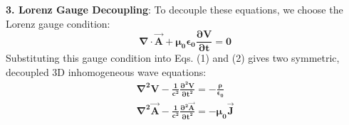 \begin{theorysol}
\textbf{3. Lorenz Gauge Decoupling}:
To decouple these equations, we choose the Lorenz gauge condition:
\begin{equation}
\mathbf{\nabla \cdot \vec{A} + \mu_0\epsilon_0 \frac{\partial V}{\partial t} = 0}
\end{equation}
Substituting this gauge condition into Eqs. (1) and (2) gives two symmetric, decoupled 3D inhomogeneous wave equations:
\begin{align}
\mathbf{\nabla^2 V - \frac{1}{c^2}\frac{\partial^2 V}{\partial t^2} = -\frac{\rho}{\epsilon_0}} \\
\mathbf{\nabla^2 \vec{A} - \frac{1}{c^2}\frac{\partial^2 \vec{A}}{\partial t^2} = -\mu_0 \vec{J}}
\end{align}
\end{theorysol}
\vspace{4mm}

